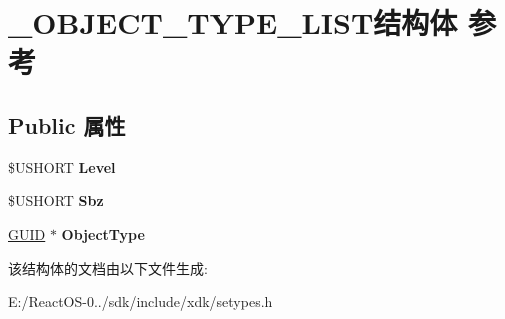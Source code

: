\hypertarget{struct___o_b_j_e_c_t___t_y_p_e___l_i_s_t}{}\section{\+\_\+\+O\+B\+J\+E\+C\+T\+\_\+\+T\+Y\+P\+E\+\_\+\+L\+I\+S\+T结构体 参考}
\label{struct___o_b_j_e_c_t___t_y_p_e___l_i_s_t}
\subsection*{Public 属性}
\begin{DoxyCompactItemize}
\item 
\mbox{\label{struct___o_b_j_e_c_t___t_y_p_e___l_i_s_t_aa6bab481dfd791bfd223403639607207}} 
\$U\+S\+H\+O\+RT {\bfseries Level}
\item 
\mbox{\label{struct___o_b_j_e_c_t___t_y_p_e___l_i_s_t_a421ddd64b220102666825fdb5e4e1048}} 
\$U\+S\+H\+O\+RT {\bfseries Sbz}
\item 
\mbox{\label{struct___o_b_j_e_c_t___t_y_p_e___l_i_s_t_aba819c1cdbbaf38fd790922c0066ec45}} 
\hyperlink{interface_g_u_i_d}{G\+U\+ID} $\ast$ {\bfseries Object\+Type}
\end{DoxyCompactItemize}


该结构体的文档由以下文件生成\+:\begin{DoxyCompactItemize}
\item 
E\+:/\+React\+O\+S-\/0../sdk/include/xdk/setypes.\+h\end{DoxyCompactItemize}
